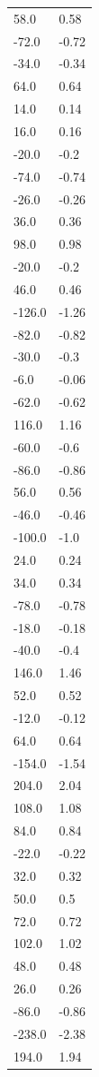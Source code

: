 \begin{longtable}{ll}
58.0 & 0.58 \\
-72.0 & -0.72 \\
-34.0 & -0.34 \\
64.0 & 0.64 \\
14.0 & 0.14 \\
16.0 & 0.16 \\
-20.0 & -0.2 \\
-74.0 & -0.74 \\
-26.0 & -0.26 \\
36.0 & 0.36 \\
98.0 & 0.98 \\
-20.0 & -0.2 \\
46.0 & 0.46 \\
-126.0 & -1.26 \\
-82.0 & -0.82 \\
-30.0 & -0.3 \\
-6.0 & -0.06 \\
-62.0 & -0.62 \\
116.0 & 1.16 \\
-60.0 & -0.6 \\
-86.0 & -0.86 \\
56.0 & 0.56 \\
-46.0 & -0.46 \\
-100.0 & -1.0 \\
24.0 & 0.24 \\
34.0 & 0.34 \\
-78.0 & -0.78 \\
-18.0 & -0.18 \\
-40.0 & -0.4 \\
146.0 & 1.46 \\
52.0 & 0.52 \\
-12.0 & -0.12 \\
64.0 & 0.64 \\
-154.0 & -1.54 \\
204.0 & 2.04 \\
108.0 & 1.08 \\
84.0 & 0.84 \\
-22.0 & -0.22 \\
32.0 & 0.32 \\
50.0 & 0.5 \\
72.0 & 0.72 \\
102.0 & 1.02 \\
48.0 & 0.48 \\
26.0 & 0.26 \\
-86.0 & -0.86 \\
-238.0 & -2.38 \\
194.0 & 1.94 \\

\end{longtable}
